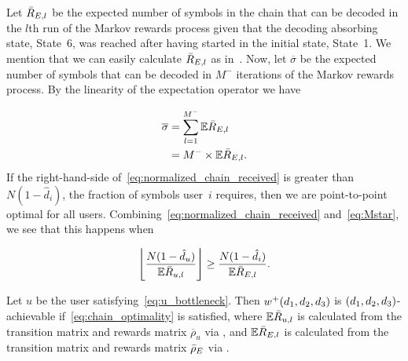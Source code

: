 Let $\bar{R}_{E, l}$ be the expected number of symbols in the chain that can be decoded in the $l$th run of the Markov rewards process given that the decoding absorbing state, State~6, was reached after having started in the initial state, State~1.  
We mention that we can easily calculate $\bar{R}_{E, l}$ as in~\cite[Theorem~\markovthm{}]{TMK_markov}.  %
%
%
Now, let $\overline{\sigma}$ be the expected number of symbols that can be decoded in $M^{-}$ iterations of the Markov rewards process.  By the linearity of the expectation operator we have

\begin{align}
	\overline{\sigma} &= \sum_{l = 1}^{M^{-}} \mathbb{E}\bar{R}_{E, l} \\
	\label{eq:normalized_chain_received}
	&= M^{-} \times \mathbb{E}\bar{R}_{E, l}.
\end{align}
If the right-hand-side of~\eqref{eq:normalized_chain_received} is greater than $N(1 - \hat{d}_i)$, the fraction of symbols user~$i$ requires, then we are point-to-point optimal for all users.  Combining~\eqref{eq:normalized_chain_received} and~\eqref{eq:Mstar}, we see that this happens when 

\begin{align}
\label{eq:chain_optimality}
	\left\lfloor{\frac{N(1 - \hat{d}_u)}{\mathbb{E}\ensuremath{\bar{R}_{u, l}}}}\right\rfloor \geq \frac{N(1 - \hat{d}_i)}{\mathbb{E}\bar{R}_{E, l}}.
\end{align}

\begin{theorem}
\label{thm:chaining_sufficient}
	Let $u$ be the user satisfying~\eqref{eq:u_bottleneck}.  Then $w^{+}(d_1, d_2, d_3)$ is $(d_1, d_2, d_3)$-achievable if~\eqref{eq:chain_optimality} is satisfied, where $\mathbb{E}\bar{R}_{u, l}$ is calculated from the transition matrix and rewards matrix $\overline{\rho}_{u}$ via \cite[Corollary~\markovcor{}]{TMK_markov}, and $\mathbb{E}\bar{R}_{E, l}$ is calculated from the transition matrix and rewards matrix $\bar{\rho}_{E}$ via \cite[Theorem~\markovthm{}]{TMK_markov}.
\end{theorem}

